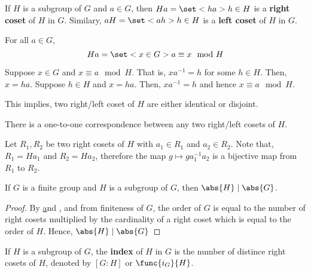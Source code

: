 \begin{definition}
    If \(H\) is a subgroup of \(G\) and \(a \in G\), then \(Ha = \set<ha>{h \in H}\) is a \textbf{right coset} of \(H\) in \(G\). Similary, \(aH = \set<ah>{h \in H}\) is a \textbf{left coset} of \(H\) in \(G\).
\end{definition}

\begin{lemma}\label{lm:cosetsAreEquivalenceClasses}
    For all \(a \in G\), 
    \begin{equation*}
        Ha = \set<x \in G>{a \equiv x \mod{H}}
    \end{equation*}
\end{lemma}

\begin{prooflemma}
    Suppose \(x \in G\) and \(x \equiv a \mod{H}\). That is, \(xa^{-1} = h\) for some \(h \in H\). Then, \(x = ha\). Suppose \(h \in H\) and \(x = ha\). Then, \(xa^{-1} = h\) and hence \(x \equiv a \mod{H}\).
\end{prooflemma}

This implies, two right/left coset of \(H\) are either identical or disjoint.

\begin{lemma}\label{lm:cosetsHaveSameCardinality}
    There is a one-to-one correspondence between any two right/left cosets of \(H\).
\end{lemma}

\begin{prooflemma}
    Let \(R_1,R_2\) be two right cosets of \(H\) with \(a_1 \in R_1\) and \(a_2 \in R_2\). Note that, \(R_1 = Ha_1\) and \(R_2 = Ha_2\), therefore the map \(g \mapsto ga_1^{-1} a_2\) is a bijective map from \(R_1\) to \(R_2\).
\end{prooflemma}

\begin{theorem}
    If \(G\) is a finite group and \(H\) is a subgroup of \(G\), then \(\abs{H} \mid \abs{G}\).
\end{theorem}

\begin{proof}
    By \href{lm:cosetsAreEquivalenceClasses} and \href{lm:cosetsHaveSameCardinality}, and from finiteness of \(G\), the order of \(G\) is equal to the number of right cosets multiplied by the cardinality of a right coset which is equal to the order of \(H\). Hence, \(\abs{H} \mid \abs{G}\)
\end{proof}

\begin{definition}
    If \(H\) is a subgroup of \(G\), the \textbf{index} of \(H\) in \(G\) is the number of distince right cosets of \(H\), denoted by \([G:H]\) or \(\func{i_G}{H}\).
\end{definition}


